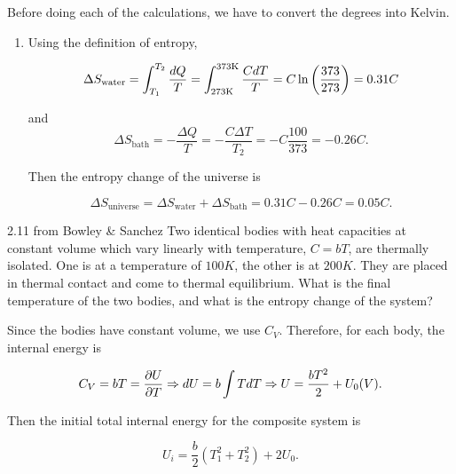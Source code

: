         Before doing each of the calculations, we have to convert the degrees into Kelvin.
        \begin{enumerate}[label = (\alph*)]
            \item Using the definition of entropy,
            
            \begin{equation}
                \Delta S_\text{water} = \int_{T_1}^{T_2}\frac{dQ}{T} = \int_\text{273K}^\text{373K} \frac{CdT}{T} = C\ln\left( \frac{373}{273} \right)=0.31C
            \end{equation}
            
            and     
            \begin{equation}
                \Delta S_\text{bath} = -\frac{\Delta Q}{T} = -\frac{C\Delta T}{T_2} = -C\frac{100}{373} = -0.26C.
            \end{equation}
            
            Then the entropy change of the universe is 
            
            \begin{equation}
                \Delta S_\text{universe}=\Delta S_\text{water}+\Delta S_\text{bath} = 0.31C-0.26C = 0.05C.
            \end{equation}
        \end{enumerate}
        
    \begin{eocproblem*}{2.11 from Bowley \& Sanchez}
        Two identical bodies with heat capacities at constant volume which vary linearly with temperature, $C=bT$, are thermally isolated. One is at a temperature of $100 \si{K}$, the other is at $200\si{K}$. They are placed in thermal contact and come to thermal equilibrium. What is the final temperature of the two bodies, and what is the entropy change of the system?
    \end{eocproblem*}
        Since the bodies have constant volume, we use $C_V$. Therefore, for each body, the internal energy is
        
        \begin{equation}
            C_V = bT = \frac{\partial U}{\partial T} \Rightarrow dU = b\int T dT \Rightarrow U = \frac{bT^2}{2} + U_0(V).
        \end{equation}
        
        Then the initial total internal energy for the composite system is
        
        \begin{equation}
            U_i = \frac{b}{2}(T_1^2+T_2^2) + 2U_0.
        \end{equation}
        
